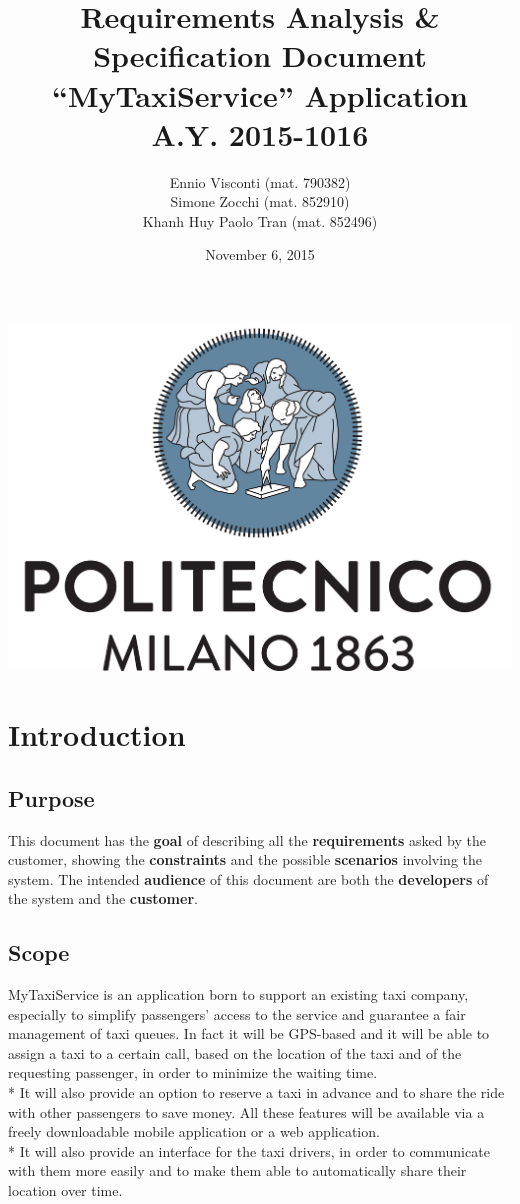\documentclass{article}
\title{\textbf{R}equirements \textbf{A}nalysis \& \textbf{S}pecification \textbf{D}ocument \\ ``MyTaxiService'' Application\\ A.Y. 2015-1016}
\author{Ennio Visconti (mat. 790382)\\ Simone Zocchi (mat. 852910)\\ Khanh Huy Paolo Tran (mat. 852496)}
\date{November 6, 2015}
\begin{document}
\begin{titlepage}

\maketitle 
\vfill
\centerline{\includegraphics[scale=0.5]{LogoPolimi}}
\vfill
\vfill
\end{titlepage}


\tableofcontents

\newpage


\section{Introduction}


\subsection{Purpose}
This document has the \textbf{goal} of describing all the \textbf{requirements} asked by the customer, showing the \textbf{constraints} and the possible \textbf{scenarios} involving the system.
The intended \textbf{audience} of this document are both the \textbf{developers} of the system and the \textbf{customer}.

\subsection{Scope}
MyTaxiService is an application born to support an existing taxi company, especially to simplify passengers{'} access to the service and guarantee a fair management of taxi queues. In fact it will be GPS-based and it will be able to assign a taxi to a certain call, based on the location of the taxi and of the requesting passenger, in order to minimize the waiting time.\\*
It will also provide an option to reserve a taxi in advance and to share the ride with other passengers to save money. All these features will be available via a freely downloadable mobile application or a web application.\\*
It will also provide an interface for the taxi drivers, in order to communicate with them more easily and to make them able to automatically share their location over time.
\end{document}
